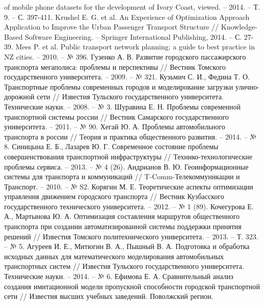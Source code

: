 \begin{thebibliography}{10}
        of mobile phone datasets for the development of Ivory Coast, 
        viewed. -- 2014. -- Т. 9. -- С. 397-411.
     Krushel E. G. et al. An Experience of Optimization Approach Application to Improve 
        the Urban Passenger Transport Structure // Knowledge-Based Software Engineering. -- Springer 
        International Publishing, 2014. -- С. 27-39.
     Mees P. et al. Public transport network planning: a guide to best practice in NZ 
        cities. -- 2010. -- № 396.
     Гузенко А. В. Развитие городского пассажирского транспорта мегаполиса: проблемы 
        и перспективы // Вестник Томского государственного университета. -- 2009. -- № 321.
     Кузьмич С. И., Федина Т. О. Транспортные проблемы современных городов и 
        моделирование загрузки улично-дорожной сети // Известия Тульского государственного 
        университета. Технические науки. -- 2008. -- № 3.
     Шуравина Е. Н. Проблемы современной транспортной системы россии // 
        Вестник Самарского государственного университета. -- 2011. -- № 90.
     Хегай Ю. А. Проблемы автомобильного транспорта в россии // Теория и практика 
        общественного развития. -- 2014. -- № 8.
     Синицына Е. Б., Лазарев Ю. Г. Современное состояние проблемы совершенствования 
        транспортной инфраструктуры // Технико-технологические проблемы сервиса. -- 2013. -- № 4 (26).
     Андрианов В. Ю. Геоинформационные системы для транспорта и коммуникаций // 
        T-Comm-Телекоммуникации и Транспорт. -- 2010. -- № S2.
     Корягин М. Е. Теоретические аспекты оптимизации управления движением городского 
        транспорта // Вестник Кузбасского государственного технического университета. -- 2012. -- № 1 (89).
     Кочегурова Е. А., Мартынова Ю. А. Оптимизация составления маршрутов общественного 
        транспорта при создании автоматизированной системы поддержки принятия решений // 
        Известия Томского политехнического университета. -- 2013. -- Т. 323. -- № 5.
     Агуреев И. Е., Митюгин В. А., Пышный В. А. Подготовка и обработка исходных данных 
        для математического моделирования автомобильных транспортных систем // Известия Тульского 
        государственного университета. Технические науки. -- 2014. -- № 6.
     Ефимова Е. А. Сравнительный анализ создания имитационной модели пропускной 
        способности городской транспортной сети // Известия высших учебных заведений. Поволжский регион. 

\end{thebibliography}
